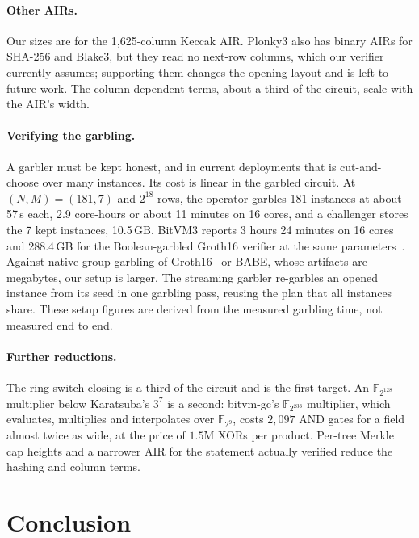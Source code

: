 \documentclass[11pt]{article}
\newcommand{\F}{\mathbb{F}_{2^{128}}}
\newcommand{\AND}{\textsf{AND}}
\newcommand{\XOR}{\textsf{XOR}}
\begin{document}
\paragraph{Other AIRs.} Our sizes are for the 1{,}625-column Keccak AIR. Plonky3
also has binary AIRs for SHA-256 and Blake3, but they read no next-row columns,
which our verifier currently assumes; supporting them changes the opening layout
and is left to future work. The column-dependent terms, about a third of the
circuit, scale with the AIR's width.

\paragraph{Verifying the garbling.} A garbler must be kept honest, and in
current deployments that is cut-and-choose over many instances. Its cost is
linear in the garbled circuit. At $(N,M)=(181,7)$ and $2^{18}$ rows, the
operator garbles 181 instances at about 57\,s each, 2.9 core-hours or about
11 minutes on 16 cores, and a challenger stores the 7 kept instances, 10.5\,GB.
BitVM3 reports 3 hours 24 minutes on 16 cores and 288.4\,GB for the
Boolean-garbled Groth16 verifier at the same parameters~\cite{bitvm3paper}.
Against native-group garbling of Groth16~\cite{kflt26native} or BABE, whose
artifacts are megabytes, our setup is larger. The streaming garbler re-garbles
an opened instance from its seed in one garbling pass, reusing the plan that all
instances share. These setup figures are derived from the measured garbling time,
not measured end to end.

\paragraph{Further reductions.} The ring switch closing is a third of the
circuit and is the first target. An $\F$ multiplier below Karatsuba's
$3^7$ is a second: bitvm-gc's $\mathbb{F}_{2^{233}}$ multiplier, which evaluates,
multiplies and interpolates over $\mathbb{F}_{2^9}$, costs $2{,}097$ \AND{} gates
for a field almost twice as wide, at the price of $1.5$M \XOR{}s per product.
Per-tree Merkle cap heights and a narrower AIR for the statement actually
verified reduce the hashing and column terms.

\section{Conclusion}
\end{document}
